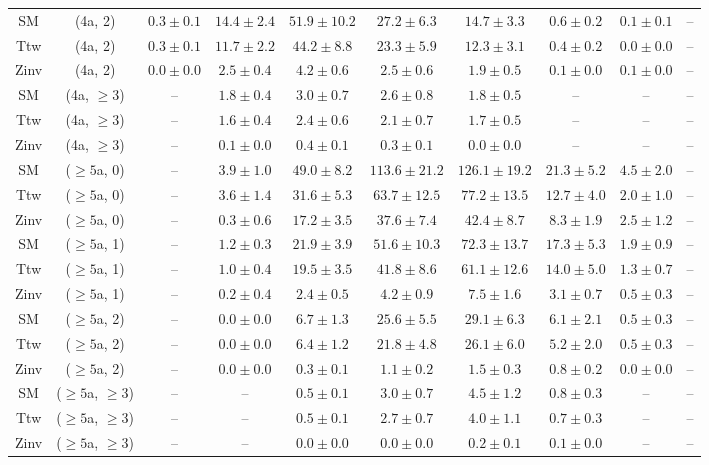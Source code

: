 \begin{table}[h!]
{\begin{tabular}{cccccccccc}
	SM & (4a, 2) & $0.3\pm 0.1$ & $14.4\pm 2.4$ & $51.9\pm 10.2$ & $27.2\pm 6.3$ & $14.7\pm 3.3$ & $0.6\pm 0.2$ & $0.1\pm 0.1$ & -- \\[0.5ex] 
	Ttw & (4a, 2) & $0.3\pm 0.1$ & $11.7\pm 2.2$ & $44.2\pm 8.8$ & $23.3\pm 5.9$ & $12.3\pm 3.1$ & $0.4\pm 0.2$ & $0.0\pm 0.0$ & -- \\[0.5ex] 
	Zinv & (4a, 2) & $0.0\pm 0.0$ & $2.5\pm 0.4$ & $4.2\pm 0.6$ & $2.5\pm 0.6$ & $1.9\pm 0.5$ & $0.1\pm 0.0$ & $0.1\pm 0.0$ & -- \\[0.5ex] 
	SM & (4a, $\ge3$) & -- & $1.8\pm 0.4$ & $3.0\pm 0.7$ & $2.6\pm 0.8$ & $1.8\pm 0.5$ & -- & -- & -- \\[0.5ex] 
	Ttw & (4a, $\ge3$) & -- & $1.6\pm 0.4$ & $2.4\pm 0.6$ & $2.1\pm 0.7$ & $1.7\pm 0.5$ & -- & -- & -- \\[0.5ex] 
	Zinv & (4a, $\ge3$) & -- & $0.1\pm 0.0$ & $0.4\pm 0.1$ & $0.3\pm 0.1$ & $0.0\pm 0.0$ & -- & -- & -- \\[0.5ex] 
	SM & ($\ge5$a, 0) & -- & $3.9\pm 1.0$ & $49.0\pm 8.2$ & $113.6\pm 21.2$ & $126.1\pm 19.2$ & $21.3\pm 5.2$ & $4.5\pm 2.0$ & -- \\[0.5ex] 
	Ttw & ($\ge5$a, 0) & -- & $3.6\pm 1.4$ & $31.6\pm 5.3$ & $63.7\pm 12.5$ & $77.2\pm 13.5$ & $12.7\pm 4.0$ & $2.0\pm 1.0$ & -- \\[0.5ex] 
	Zinv & ($\ge5$a, 0) & -- & $0.3\pm 0.6$ & $17.2\pm 3.5$ & $37.6\pm 7.4$ & $42.4\pm 8.7$ & $8.3\pm 1.9$ & $2.5\pm 1.2$ & -- \\[0.5ex] 
	SM & ($\ge5$a, 1) & -- & $1.2\pm 0.3$ & $21.9\pm 3.9$ & $51.6\pm 10.3$ & $72.3\pm 13.7$ & $17.3\pm 5.3$ & $1.9\pm 0.9$ & -- \\[0.5ex] 
	Ttw & ($\ge5$a, 1) & -- & $1.0\pm 0.4$ & $19.5\pm 3.5$ & $41.8\pm 8.6$ & $61.1\pm 12.6$ & $14.0\pm 5.0$ & $1.3\pm 0.7$ & -- \\[0.5ex] 
	Zinv & ($\ge5$a, 1) & -- & $0.2\pm 0.4$ & $2.4\pm 0.5$ & $4.2\pm 0.9$ & $7.5\pm 1.6$ & $3.1\pm 0.7$ & $0.5\pm 0.3$ & -- \\[0.5ex] 
	SM & ($\ge5$a, 2) & -- & $0.0\pm 0.0$ & $6.7\pm 1.3$ & $25.6\pm 5.5$ & $29.1\pm 6.3$ & $6.1\pm 2.1$ & $0.5\pm 0.3$ & -- \\[0.5ex] 
	Ttw & ($\ge5$a, 2) & -- & $0.0\pm 0.0$ & $6.4\pm 1.2$ & $21.8\pm 4.8$ & $26.1\pm 6.0$ & $5.2\pm 2.0$ & $0.5\pm 0.3$ & -- \\[0.5ex] 
	Zinv & ($\ge5$a, 2) & -- & $0.0\pm 0.0$ & $0.3\pm 0.1$ & $1.1\pm 0.2$ & $1.5\pm 0.3$ & $0.8\pm 0.2$ & $0.0\pm 0.0$ & -- \\[0.5ex] 
	SM & ($\ge5$a, $\ge3$) & -- & -- & $0.5\pm 0.1$ & $3.0\pm 0.7$ & $4.5\pm 1.2$ & $0.8\pm 0.3$ & -- & -- \\[0.5ex] 
	Ttw & ($\ge5$a, $\ge3$) & -- & -- & $0.5\pm 0.1$ & $2.7\pm 0.7$ & $4.0\pm 1.1$ & $0.7\pm 0.3$ & -- & -- \\[0.5ex] 
	Zinv & ($\ge5$a, $\ge3$) & -- & -- & $0.0\pm 0.0$ & $0.0\pm 0.0$ & $0.2\pm 0.1$ & $0.1\pm 0.0$ & -- & -- \\[0.5ex] 
	\hline
	\hline
\end{tabular}}
\end{table}
